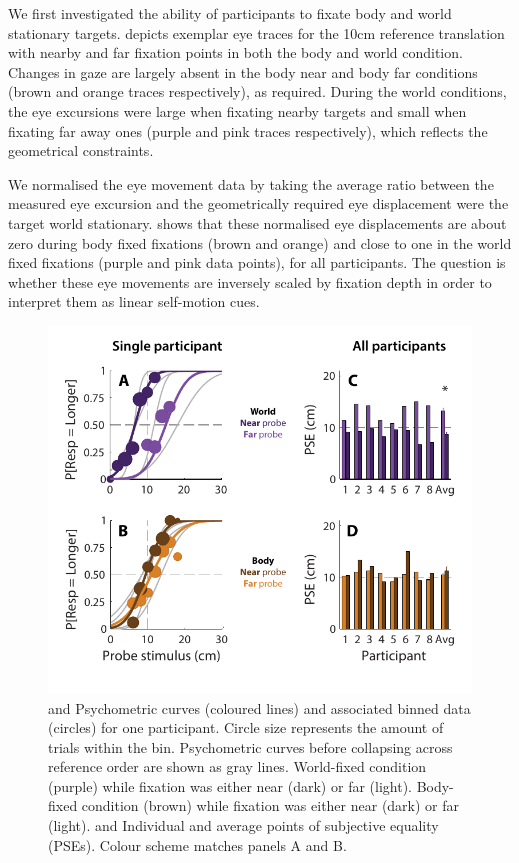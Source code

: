 We first investigated the ability of participants to fixate body and world stationary targets.  depicts exemplar eye traces for the 10cm reference translation with nearby and far fixation points in both the body and world condition. Changes in gaze are largely absent in the body near and body far conditions (brown and orange traces respectively), as required. During the world conditions, the eye excursions were large when fixating nearby targets and small when fixating far away ones (purple and pink traces respectively), which reflects the geometrical constraints.

We normalised the eye movement data by taking the average ratio between the measured eye excursion and the geometrically required eye displacement were the target world stationary.  shows that these normalised eye displacements are about zero during body fixed fixations (brown and orange) and close to one in the world fixed fixations (purple and pink data points), for all participants. The question is whether these eye movements are inversely scaled by fixation depth in order to interpret them as linear self-motion cues.

\begin{figure}
    \includegraphics[width=1.0\textwidth]{src/paper4/p4_figure3.pdf}

	\caption{ and  Psychometric curves (coloured lines) and associated binned data (circles) for one participant. Circle size represents the amount of trials within the bin. Psychometric curves before collapsing across reference order are shown as gray lines.  World-fixed condition (purple) while fixation was either near (dark) or far (light).  Body-fixed condition (brown) while fixation was either near (dark) or far (light).
	 and  Individual and average points of subjective equality (PSEs). Colour scheme matches panels A and B.
	}
	\label{p4:fig3}
\end{figure}

